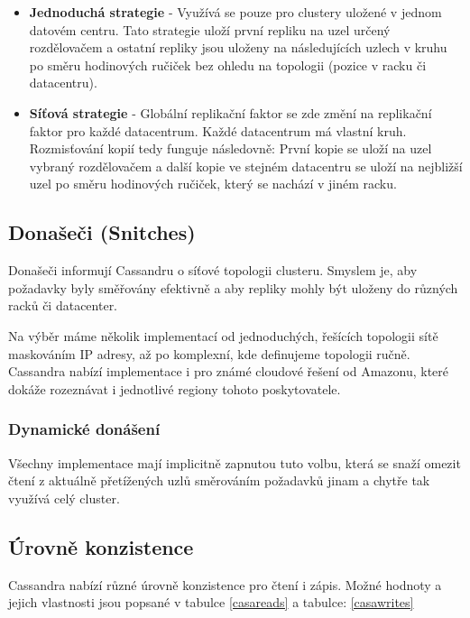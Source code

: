 \begin{itemize}
\item \textbf{Jednoduchá strategie} - Využívá se pouze pro clustery uložené v jednom datovém centru. Tato strategie uloží první repliku na uzel určený rozdělovačem a ostatní repliky jsou uloženy na následujících uzlech v kruhu po směru hodinových ručiček bez ohledu na topologii (pozice v racku či datacentru).
\item \textbf{Síťová strategie} - Globální replikační faktor se zde změní na replikační faktor pro každé datacentrum. Každé datacentrum má vlastní kruh. Rozmisťování kopií tedy funguje následovně: První kopie se uloží na uzel vybraný rozdělovačem a další kopie ve stejném datacentru se uloží na nejbližší uzel po směru hodinových ručiček, který se nachází v jiném racku. 
\end{itemize}

\subsection{Donašeči (Snitches)}
Donašeči informují Cassandru o síťové topologii clusteru. Smyslem je, aby požadavky byly směřovány efektivně a aby repliky mohly být uloženy do různých racků či datacenter. 

Na výběr máme několik implementací od jednoduchých, řešících topologii sítě maskováním IP adresy, až po komplexní, kde definujeme topologii ručně. Cassandra nabízí implementace i pro známé cloudové řešení od Amazonu, které dokáže rozeznávat i jednotlivé regiony tohoto poskytovatele.

\subsubsection{Dynamické donášení}
Všechny implementace mají implicitně zapnutou tuto volbu, která se snaží omezit čtení z aktuálně přetížených uzlů směrováním požadavků jinam a chytře tak využívá celý cluster. 

\subsection{Úrovně konzistence}
Cassandra nabízí různé úrovně konzistence pro čtení i zápis. Možné hodnoty a jejich vlastnosti jsou popsané v tabulce \ref{casareads} a tabulce: \ref{casawrites}

